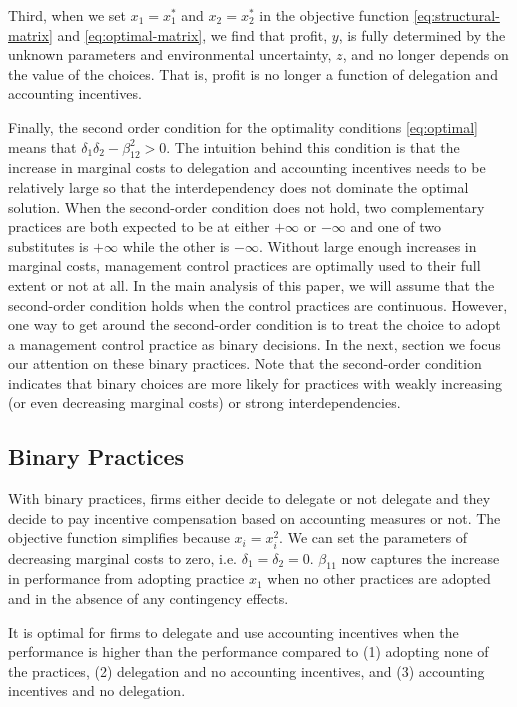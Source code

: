 \documentclass[12pt]{article}
\begin{document}
Third, when we set $x_1 = x_1^*$ and  $x_2 = x_2^*$ in the objective function  \eqref{eq:structural-matrix} and \eqref{eq:optimal-matrix}, we find that profit, $y$, is fully determined by the unknown parameters and environmental uncertainty, $z$, and no longer depends on the value of the choices. That is, profit is no longer a function of delegation and accounting incentives. 

Finally, the second order condition for the optimality conditions \eqref{eq:optimal} means that  $\delta_1 \delta_2 - \beta_{12}^2 > 0$. The intuition behind this condition is that the increase in marginal costs to delegation and accounting incentives needs to be relatively large so that the interdependency does not dominate the optimal solution. When the second-order condition does not hold, two complementary practices are both expected to be at either \(+\infty\) or \(-\infty\) and one of two substitutes is \(+\infty\) while the other is \(-\infty\). Without large enough increases in marginal costs, management control practices are optimally used to their full extent or not at all. In the main analysis of this paper, we will assume that the second-order condition holds when the control practices are continuous. However, one way to get around the second-order condition is to treat the choice to adopt a management control practice as binary decisions. In the next, section we focus our attention on these binary practices. Note that the second-order condition indicates that binary choices are more likely for practices with weakly increasing (or even decreasing marginal costs) or strong interdependencies.

\subsection{Binary Practices}

With binary practices, firms either decide to delegate or not delegate and they decide to pay incentive compensation based on accounting measures or not. The objective function simplifies because $x_i = x_i^2$. We can set the parameters of decreasing marginal costs to zero, i.e. $\delta_1 = \delta_2  = 0$. $\beta_{11}$ now captures the increase in performance from adopting practice $x_1$ when no other practices are adopted and in the absence of any contingency effects. 

It is optimal for firms to delegate and use accounting incentives when the performance is higher than the performance compared to (1) adopting none of the practices, (2) delegation and no accounting incentives, and (3) accounting incentives and no delegation. 
\end{document}

